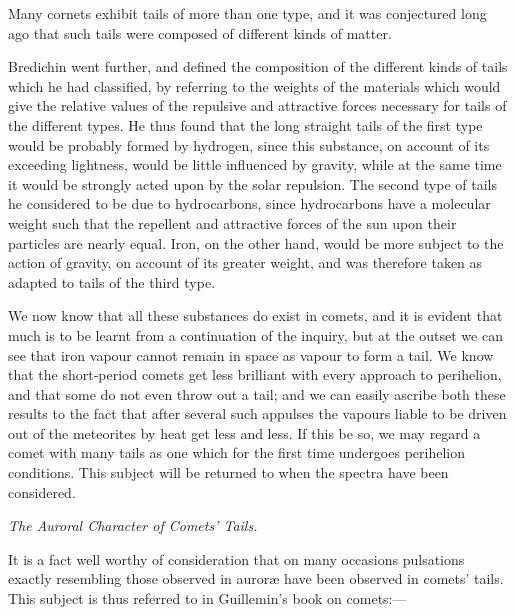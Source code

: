 \documentclass[a4paper, 12pt, oneside, polutonikogreek, english]{article}
\begin{document}
Many cornets exhibit tails of more than one type, and it was conjectured long ago that such tails were composed of different kinds of matter.

Bredichin went further, and defined the composition of the different kinds of tails which he had classified, by referring to the weights of the materials which would give the relative values of the repulsive and attractive forces necessary for tails of the different types. He thus found that the long straight tails of the first type would be probably formed by hydrogen, since this substance, on account of its exceeding lightness, would be little influenced by gravity, while at the same time it would be strongly acted upon by the solar repulsion. The second type of tails he considered to be due to hydrocarbons, since hydrocarbons have a molecular weight such that the repellent and attractive forces of the sun upon their particles are nearly equal. Iron, on the other hand, would be more subject to the action of gravity, on account of its greater weight, and was therefore taken as adapted to tails of the third type.

We now know that all these substances do exist in comets, and it is evident that much is to be learnt from a continuation of the inquiry, but at the outset we can see that iron vapour cannot remain in space as vapour to form a tail. We know that the short-period comets get less brilliant with every approach to perihelion, and that some do not even throw out a tail; and we can easily ascribe both these results to the fact that after several such appulses the vapours liable to be driven out of the meteorites by heat get less and less. If this be so, we may regard a comet with many tails as one which for the first time undergoes perihelion conditions. This subject will be returned to when the spectra have been considered.

\emph{The Auroral Character of Comets' Tails.}

It is a fact well worthy of consideration that on many occasions pulsations exactly resembling those observed in auroræ have been observed in comets' tails. This subject is thus referred to in Guillemin's book on comets:---
\end{document}
